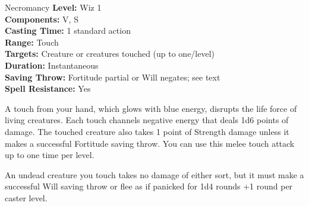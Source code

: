 {Necromancy}
{
	\textbf{Level:}
	Wiz 1\\
	\textbf{Components:}
	V, S\\
	\textbf{Casting Time:}
	1 standard action\\
	\textbf{Range:}
	Touch\\
	\textbf{Targets:}
	Creature or creatures touched (up to one/level)\\
	\textbf{Duration:}
	Instantaneous\\
	\textbf{Saving Throw:}
	Fortitude partial or Will negates; see text\\
	\textbf{Spell Resistance:}
	Yes\\
}
{
	A touch from your hand, which glows with blue energy, disrupts the life force of living creatures. Each touch channels negative energy that deals 1d6 points of damage. The touched creature also takes 1 point of Strength damage unless it makes a successful Fortitude saving throw. You can use this melee touch attack up to one time per level.

	An undead creature you touch takes no damage of either sort, but it must make a successful Will saving throw or flee as if panicked for 1d4 rounds +1 round per caster level.

}
